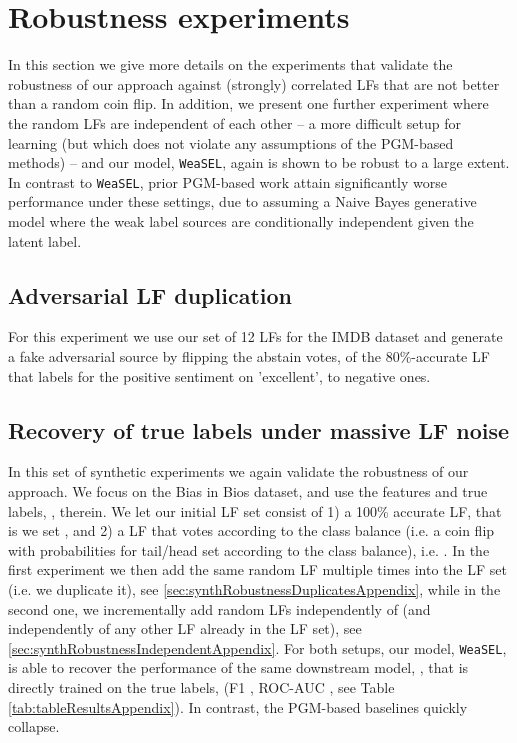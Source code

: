 \documentclass{article}
\newcommand{\weasel}{\texttt{WeaSEL}}\newcommand{\brackets}[1]{\left( #1 \right)}
\begin{document}
\section{Robustness experiments}
\label{sec:robustnessAppendix}
In this section we give more details on the experiments that validate the robustness of our approach against (strongly) correlated LFs that are not better than a random coin flip. In addition, we present one further experiment where the random LFs are independent of each other -- a more difficult setup for learning (but which does not violate any assumptions of the PGM-based methods) -- and our model, \weasel, again is shown to be robust to a large extent.
\\
In contrast to \weasel, prior PGM-based work \cite{Snorkel, triplets, TripletsMean} attain significantly worse performance under these settings, due to assuming a Naive Bayes generative model where the weak label sources are conditionally independent given the latent label.
\subsection{Adversarial LF duplication}
\label{sec:advRobustnessAppendix}
For this experiment we use our set of 12 LFs for the IMDB dataset and generate a fake adversarial source by flipping the abstain votes, of the 80\%-accurate LF that labels for the positive sentiment on 'excellent', to negative ones.
\subsection{Recovery of true labels under massive LF noise}
\label{sec:synthRobustnessAppendix}
In this set of synthetic experiments we again validate the robustness of our approach. We focus on the Bias in Bios dataset, and use the features and true labels, , therein. We let our initial LF set consist of 1) a 100\% accurate LF, that is we set , and 2) a LF that votes according to the class balance (i.e. a coin flip with probabilities for tail/head set according to the class balance), i.e. .
In the first experiment we then add the same random LF  multiple times into the LF set (i.e. we duplicate it), see \ref{sec:synthRobustnessDuplicatesAppendix}, while in the second one, we incrementally add random LFs independently of  (and independently of any other LF already in the LF set), see \ref{sec:synthRobustnessIndependentAppendix}.
For both setups, our model, \weasel, is able to recover the performance of the same downstream model, , that is directly trained on the true labels,  (F1 , ROC-AUC , see Table \ref{tab:tableResultsAppendix}).
In contrast, the PGM-based baselines quickly collapse.
\end{document}
